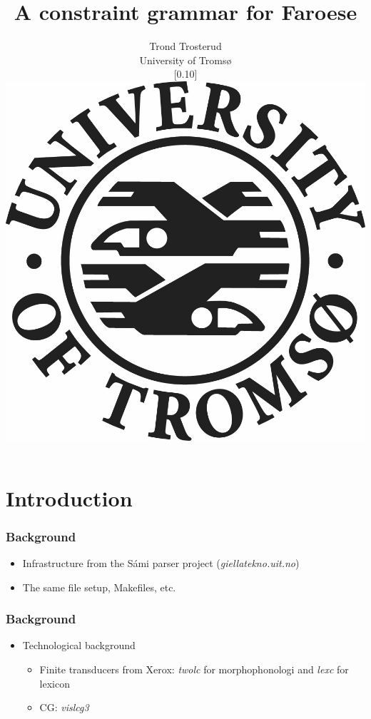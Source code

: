 \documentclass{beamer}
\begin{document}
\title{A constraint grammar for Faroese}
\author{Trond Trosterud \\ 
University of Tromsø \begin{figure}  \scalebox{0.10}[0.10]{\includegraphics{img/LogoEngelsk}} \end{figure} 
}

\date

\frame{\titlepage} 


\section{Introduction} 

\begin{frame}
\frametitle{Background}
\begin{itemize}
\item Infrastructure from the Sámi parser project (\textit{giellatekno.uit.no})
\item The same file setup, Makefiles, etc.
\end{itemize}
\end{frame}


\begin{frame}
\frametitle{Background}
\begin{itemize}
\item Technological background
\begin{itemize}
\item Finite transducers from Xerox: \textit{twolc} for morphophonologi and \textit{lexc} for lexicon
\item CG: \textit{vislcg3}
\end{itemize}
\end{itemize}
\end{frame}
\end{document}
